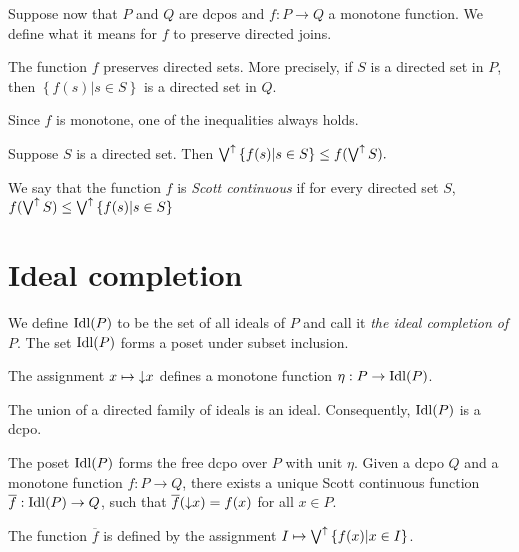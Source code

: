 Suppose now that \(P\) and \(Q\) are dcpos and \(f : P \to Q\) a monotone function. We define what it means for \(f\) to preserve directed joins.

\begin{lemma}
  The function \(f\) preserves directed sets. More precisely, if \(S\) is a directed set in \(P\), then \( \left\{ f(s) \vert s \in S \right\}\) is a directed set in \(Q\).
\end{lemma}

Since \(f\) is monotone, one of the inequalities always holds.

\begin{proposition}
  Suppose \(S\) is a directed set. Then
  \(\bigvee^{\uparrow} \left\{f(s) \vert s \in S\right\} \leq f(\bigvee^{\uparrow} S).\)
\end{proposition}

\begin{definition}
  We say that the function \(f\) is \emph{Scott continuous} if for every directed set \(S\), \(f(\bigvee^{\uparrow} S) \leq \bigvee^{\uparrow} \left\{f(s) \vert s \in S\right\}\)
\end{definition}

\chapter{Ideal completion}

\begin{definition}
  We define \(\operatorname{Idl}(P)\) to be the set of all ideals of \(P\) and call it \emph{the ideal completion of \(P\)}. The set \(\operatorname{Idl}(P)\) forms a poset under subset inclusion.
\end{definition}

\begin{proposition}
  The assignment \(x \mapsto {\downarrow}x\) defines a monotone function \(\eta : P \to \operatorname{Idl}(P)\).
\end{proposition}

\begin{proposition}
  The union of a directed family of ideals is an ideal. Consequently, \(\operatorname{Idl}(P)\) is a dcpo.
\end{proposition}

\begin{theorem}
  The poset \(\operatorname{Idl}(P)\) forms the free dcpo over \(P\) with unit \(\eta\). Given a dcpo \(Q\) and a monotone function \(f : P \to Q\), there exists a unique Scott continuous function
  \(\overline{f} : \operatorname{Idl}(P) \to Q\), such that \(\overline{f}({\downarrow}x) = f(x)\) for all \(x \in P\).

  The function \(\overline{f}\) is defined by the assignment \(I \mapsto \bigvee^{\uparrow} \left\{ f(x) \vert x \in I \right\}\).
\end{theorem}

